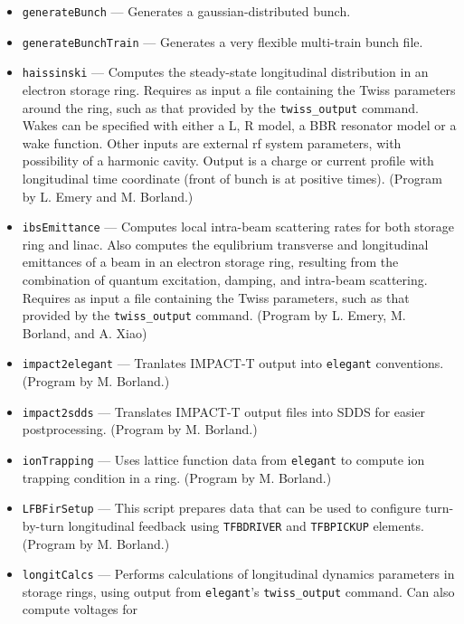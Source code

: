 \documentclass[11pt]{article}
\begin{document}
\begin{itemize}
        some restrictions) into formats accepted by other programs, such as COSY, PARMELA, 
        PATPET, PATRICIA, TRANSPORT, XORBIT, and MAD8.  Will also generate an SDDS file containing lattice
        data.  (Program by M. Borland.)
\item {\tt generateBunch} --- Generates a gaussian-distributed bunch.
\item {\tt generateBunchTrain} --- Generates a very flexible multi-train bunch file.
\item {\tt haissinski} --- Computes the steady-state longitudinal distribution in
        an electron storage ring.  Requires as input a file containing the Twiss
        parameters around the ring, such as that provided by the \verb|twiss_output| command.
        Wakes can be specified with either a L, R model, a BBR resonator model or a wake function.
        Other inputs are external rf system parameters, with possibility of a harmonic
        cavity. Output is a charge or current profile with longitudinal time coordinate (front
        of bunch is at positive times). 
        (Program by L. Emery and M. Borland.)
\item {\tt ibsEmittance} --- Computes local intra-beam scattering rates for both storage ring
        and linac. Also computes the equlibrium transverse and longitudinal emittances of a 
        beam in an electron storage ring, resulting from the combination of quantum excitation,
        damping, and intra-beam scattering.  Requires as input a file containing the
        Twiss parameters, such as that provided by the \verb|twiss_output| command.
        (Program by L. Emery, M. Borland, and A. Xiao)
\item {\tt impact2elegant} --- Tranlates IMPACT-T \cite{IMPACT} output into {\tt elegant} conventions.
  (Program by M. Borland.)
\item {\tt impact2sdds} --- Translates IMPACT-T output files into SDDS for easier postprocessing.
  (Program by M. Borland.)
\item {\tt ionTrapping} --- Uses lattice function data from {\tt elegant} to compute ion trapping condition in
  a ring. (Program by M. Borland.)
\item {\tt LFBFirSetup} --- This script prepares data that can be used to configure turn-by-turn longitudinal feedback using
  \verb|TFBDRIVER| and \verb|TFBPICKUP| elements.
  (Program by M. Borland.)
\item {\tt longitCalcs} --- Performs calculations of longitudinal dynamics parameters in storage rings,
  using output from \verb|elegant|'s \verb|twiss_output| command. Can also compute voltages for

\end{itemize}
\end{document}
